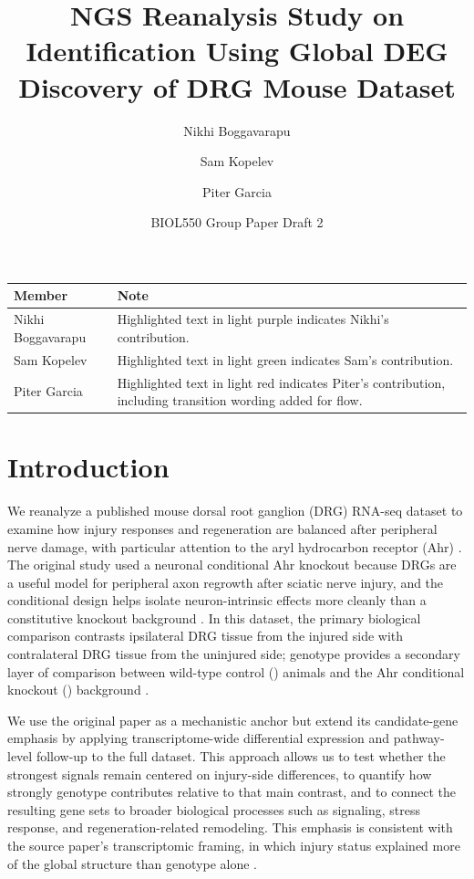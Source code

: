 \documentclass[12pt]{article}
\title{NGS Reanalysis Study on Identification Using Global DEG Discovery of DRG Mouse Dataset}
\author{Nikhi Boggavarapu \and Sam Kopelev \and Piter Garcia}
\date{BIOL550 Group Paper Draft 2}
\newcommand{\artifact}[1]{\texttt{\detokenize{#1}}}
\begin{document}
\maketitle

\begin{center}
\begin{tabular}{|p{1.7in}|p{4.6in}|}
\hline
\textbf{Member} & \textbf{Note} \\
\hline
\cellcolor{nikhibg}Nikhi Boggavarapu & \cellcolor{nikhibg}Highlighted text in light purple indicates Nikhi's contribution. \\
\hline
\cellcolor{sambg}Sam Kopelev & \cellcolor{sambg}Highlighted text in light green indicates Sam's contribution. \\
\hline
\cellcolor{piterbg}Piter Garcia & \cellcolor{piterbg}Highlighted text in light red indicates Piter's contribution, including transition wording added for flow. \\
\hline
\end{tabular}
\end{center}

\section{Introduction}
\begin{piterpara}
We reanalyze a published mouse dorsal root ganglion (DRG) RNA-seq dataset to examine how injury responses and regeneration are balanced after peripheral nerve damage, with particular attention to the aryl hydrocarbon receptor (Ahr) \parencite{halawani2023ahr,sraStudySRP618841,bioprojectPRJNA1322439,geoGSE243308}. The original study used a neuronal conditional Ahr knockout because DRGs are a useful model for peripheral axon regrowth after sciatic nerve injury, and the conditional design helps isolate neuron-intrinsic effects more cleanly than a constitutive knockout background \parencite{halawani2023ahr}. In this dataset, the primary biological comparison contrasts ipsilateral DRG tissue from the injured side with contralateral DRG tissue from the uninjured side; genotype provides a secondary layer of comparison between wild-type control (\artifact{ff}) animals and the Ahr conditional knockout (\artifact{cre}) background \parencite{halawani2023ahr,sraStudySRP618841,bioprojectPRJNA1322439,geoGSE243308}.

We use the original paper as a mechanistic anchor but extend its candidate-gene emphasis by applying transcriptome-wide differential expression and pathway-level follow-up to the full dataset. This approach allows us to test whether the strongest signals remain centered on injury-side differences, to quantify how strongly genotype contributes relative to that main contrast, and to connect the resulting gene sets to broader biological processes such as signaling, stress response, and regeneration-related remodeling. This emphasis is consistent with the source paper's transcriptomic framing, in which injury status explained more of the global structure than genotype alone \parencite{halawani2023ahr}.
\end{piterpara}
\end{document}
